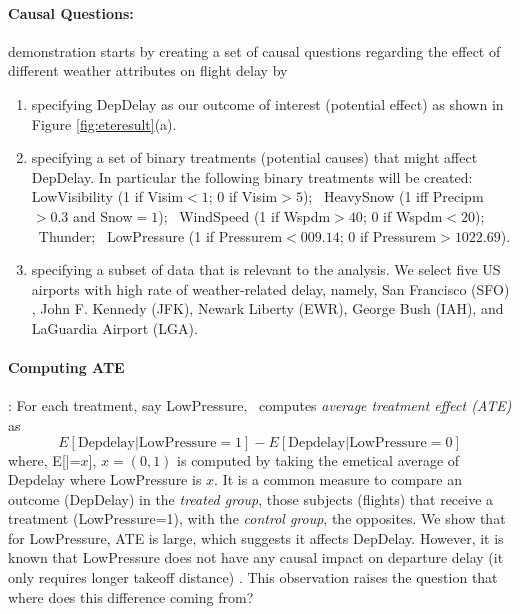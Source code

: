   \paragraph{\bf Causal Questions:} demonstration starts by creating a set of causal questions regarding the effect of different weather attributes on flight delay by
    \begin{enumerate}
      \item specifying DepDelay as our outcome of interest (potential effect) as shown in Figure \ref{fig:eteresult}(a).
      \item specifying a set of binary treatments (potential causes) that might affect DepDelay. In particular the following binary treatments will be created: LowVisibility (1 if Visim$<1$; 0 if Visim$>5$); \ HeavySnow (1 iff Precipm$>0.3$ and Snow$=1$); \ WindSpeed (1 if Wspdm$>40$; 0 if Wspdm$<20$); \  Thunder; \ LowPressure (1 if Pressurem$<009.14$; 0 if Pressurem$>1022.69$).
      
      \item specifying a subset of data that is relevant to the analysis.  We select five US airports  with high rate of weather-related delay, namely, San Francisco (SFO) , John F. Kennedy (JFK), Newark Liberty (EWR), George Bush (IAH), and LaGuardia Airport (LGA).
\end{enumerate}


 \paragraph{ \bf Computing ATE}: For each treatment, say LowPressure, \GSQL\ computes {\em average treatment effect (ATE)} as $$E[\text{Depdelay}|\text{LowPressure}=1] - E[\text{Depdelay}|\text{LowPressure}=0]$$
  where, E[|=$x$], $x=(0,1)$ is computed by taking the emetical average of  Depdelay where LowPressure is  $x$. It is a  common measure to compare an 
  outcome (DepDelay) in the {\em treated group},  those subjects (flights) that receive a treatment (LowPressure=1), with the {\em control group}, the opposites. 
We show that for LowPressure, ATE is large, which  suggests  it affects DepDelay. However, it is known that
  LowPressure does not have any causal impact on departure delay (it only requires longer takeoff distance) \cite{FAA08}. This observation raises the question that  where does this difference coming from?

